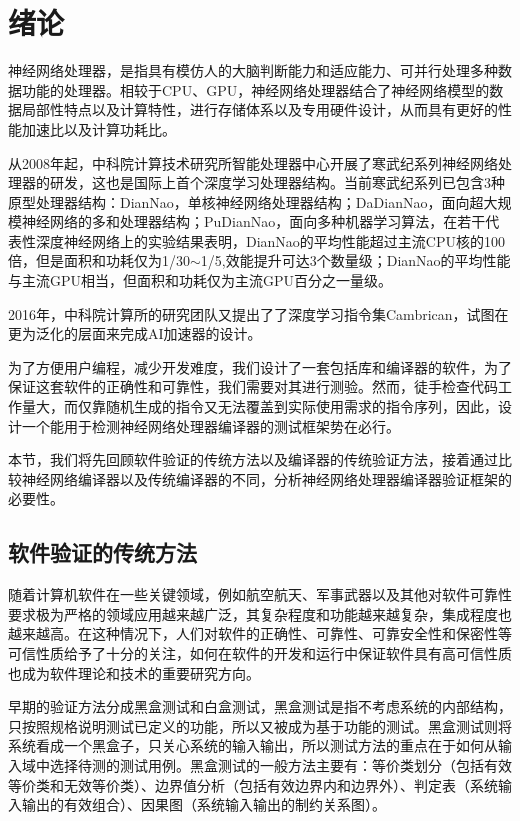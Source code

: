 ﻿\chapter{绪论}
神经网络处理器，是指具有模仿人的大脑判断能力和适应能力、可并行处理多种数据功能的处理器。相较于CPU、GPU，神经网络处理器结合了神经网络模型的数据局部性特点以及计算特性，进行存储体系以及专用硬件设计，从而具有更好的性能加速比以及计算功耗比。

从2008年起，中科院计算技术研究所智能处理器中心开展了寒武纪系列神经网络处理器的研发，这也是国际上首个深度学习处理器结构。当前寒武纪系列已包含3种原型处理器结构：DianNao，单核神经网络处理器结构；DaDianNao，面向超大规模神经网络的多和处理器结构；PuDianNao，面向多种机器学习算法，在若干代表性深度神经网络上的实验结果表明，DianNao的平均性能超过主流CPU核的100倍，但是面积和功耗仅为1/30$\sim$1/5,效能提升可达3个数量级；DianNao的平均性能与主流GPU相当，但面积和功耗仅为主流GPU百分之一量级。

2016年，中科院计算所的研究团队又提出了了深度学习指令集Cambrican，试图在更为泛化的层面来完成AI加速器的设计。

为了方便用户编程，减少开发难度，我们设计了一套包括库和编译器的软件，为了保证这套软件的正确性和可靠性，我们需要对其进行测验。然而，徒手检查代码工作量大，而仅靠随机生成的指令又无法覆盖到实际使用需求的指令序列，因此，设计一个能用于检测神经网络处理器编译器的测试框架势在必行。

本节，我们将先回顾软件验证的传统方法以及编译器的传统验证方法，接着通过比较神经网络编译器以及传统编译器的不同，分析神经网络处理器编译器验证框架的必要性。

\section{软件验证的传统方法}
随着计算机软件在一些关键领域，例如航空航天、军事武器以及其他对软件可靠性要求极为严格的领域应用越来越广泛，其复杂程度和功能越来越复杂，集成程度也越来越高。在这种情况下，人们对软件的正确性、可靠性、可靠安全性和保密性等可信性质给予了十分的关注，如何在软件的开发和运行中保证软件具有高可信性质也成为软件理论和技术的重要研究方向。

早期的验证方法分成黑盒测试和白盒测试，黑盒测试是指不考虑系统的内部结构，只按照规格说明测试已定义的功能，所以又被成为基于功能的测试。黑盒测试则将系统看成一个黑盒子，只关心系统的输入输出，所以测试方法的重点在于如何从输入域中选择待测的测试用例。黑盒测试的一般方法主要有：等价类划分（包括有效等价类和无效等价类）、边界值分析（包括有效边界内和边界外）、判定表（系统输入输出的有效组合）、因果图（系统输入输出的制约关系图）。

